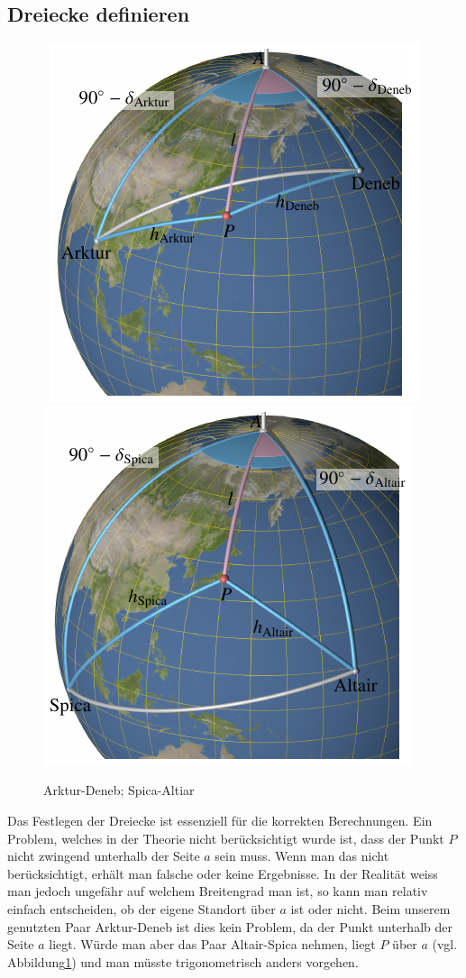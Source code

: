 \subsection{Dreiecke definieren}
\begin{figure} 
\hbox{%
\includegraphics{papers/nav/bilder/beispiele1.pdf}%
\hfill%
\includegraphics{papers/nav/bilder/beispiele2.pdf}}
\caption{Arktur-Deneb; Spica-Altiar
\label{nav:beispiele}}
\end{figure}
Das Festlegen der Dreiecke ist essenziell für die korrekten Berechnungen.
Ein Problem, welches in der Theorie nicht berücksichtigt wurde ist, dass der Punkt $P$ nicht zwingend unterhalb der Seite $a$ sein muss. 
Wenn man das nicht berücksichtigt, erhält man falsche oder keine Ergebnisse. 
In der Realität weiss man jedoch ungefähr auf welchem Breitengrad man ist, so kann man relativ einfach entscheiden, ob der eigene Standort über $a$ ist oder nicht.
Beim unserem genutzten Paar Arktur-Deneb ist dies kein Problem, da der Punkt unterhalb der Seite $a$ liegt. 
Würde man aber das Paar Altair-Spica nehmen, liegt $P$ über $a$
(vgl. Abbildung\ref{nav:beispiele}) und man müsste trigonometrisch
anders vorgehen. 

